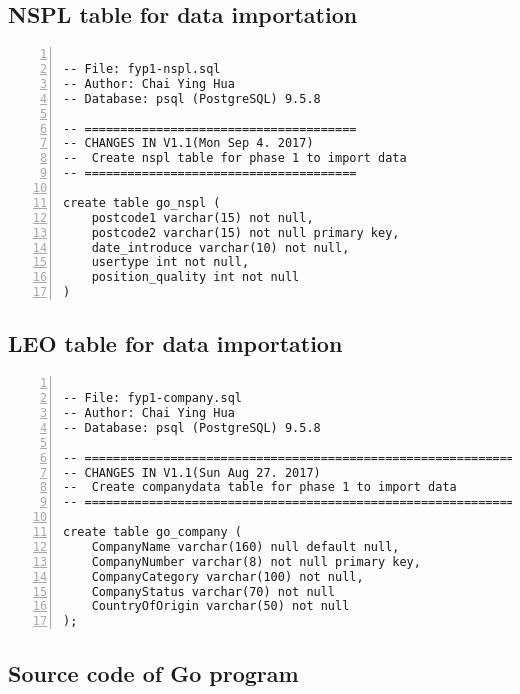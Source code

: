 \subsection {NSPL table for data importation}

\lstset{basicstyle=\ttfamily\tiny} 
\begin{lstlisting}[breaklines, frame=single, numbers=left, caption={PostgreSQL query for NSPL table creation.}, label=commandline-02]

-- File: fyp1-nspl.sql
-- Author: Chai Ying Hua 
-- Database: psql (PostgreSQL) 9.5.8

-- ======================================
-- CHANGES IN V1.1(Mon Sep 4. 2017)
-- 	Create nspl table for phase 1 to import data
-- ======================================

create table go_nspl (
	postcode1 varchar(15) not null,
	postcode2 varchar(15) not null primary key,
	date_introduce varchar(10) not null, 
	usertype int not null,
	position_quality int not null
)

\end{lstlisting}

\subsection {LEO table for data importation}

\lstset{basicstyle=\ttfamily\tiny} 
\begin{lstlisting}[breaklines, frame=single, numbers=left, caption={PostgreSQL query for Company table creation.}, label=commandline-02]

-- File: fyp1-company.sql
-- Author: Chai Ying Hua 
-- Database: psql (PostgreSQL) 9.5.8

-- =========================================================================
-- CHANGES IN V1.1(Sun Aug 27. 2017)
-- 	Create companydata table for phase 1 to import data
-- =========================================================================

create table go_company ( 
	CompanyName varchar(160) null default null, 
	CompanyNumber varchar(8) not null primary key,
	CompanyCategory varchar(100) not null,
	CompanyStatus varchar(70) not null
	CountryOfOrigin varchar(50) not null
);

\end{lstlisting}



\subsection{Source code of Go program}

